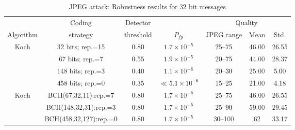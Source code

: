 \documentclass[12pt]{report}
\begin{document}
\begin{table}[!ht]
\tiny
        \begin{center}
                \begin{tabular}{|c|c|c|c|c|c|c|} \hline
				&Coding		 & Detector	&		& \multicolumn{3}{c|}{Quality}	\\ \cline{5-7}
                Algorithm       & strategy       & threshold    & $P_{fp}$      & JPEG range 			& Mean &Std. \\\hline\hline
                Koch 	& 32 bits; rep.=15      & 0.80                             & $1.7\times 10^{-5}$   & 25--75       & 46.00    & 26.55    \\ \cline{2-7}
                	& 67 bits; rep.=7       & 0.55                             & $1.9\times 10^{-5}$   & 20--75       & 44.00    & 28.37    \\ \cline{2-7}
                	& 148 bits; rep.=3      & 0.40                             & $1.1\times 10^{-6}$   & 20--30       & 25.00    & 5.00    \\ \cline{2-7}
                	& 458 bits; rep.=0      & 0.35                             & $\ll5.1\times 10^{-6}$& 15--25       & 21.00    & 4.18    \\ \hline\hline

                Koch 	& BCH(67,32,11):rep.=7  & 0.80     & $1.7\times 10^{-5}$   & 25--75         & 46.00    & 26.55    \\ \cline{2-7}
                	& BCH(148,32,31):rep.=3 & 0.80     & $1.7\times 10^{-5}$   & 25--90        & 59.00    & 29.45    \\ \cline{2-7}
                	& BCH(458,32,127):rep.=0& 0.80     & $1.7\times 10^{-5}$   & 30--100        & 62    & 33.17    \\ \hline
        \end{tabular}
        \caption{JPEG attack: Robustness results for 32 bit messages}
        \label{tab:GaussRobRes32DMLBK32_63_148}
        \end{center}
\end{table}
\normalsize
\end{document}
